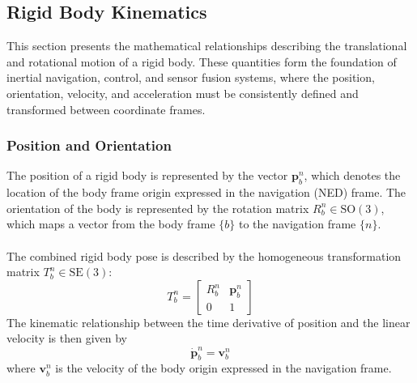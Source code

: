 \subsection{Rigid Body Kinematics}
This section presents the mathematical relationships describing the translational and rotational motion of a rigid body. These quantities form the foundation of inertial navigation, control, and sensor fusion systems, where the position, orientation, velocity, and acceleration must be consistently defined and transformed between coordinate frames.  



\subsubsection{Position and Orientation}
The position of a rigid body is represented by the vector $\mathbf{p}_b^n$, which denotes the location of the body frame origin expressed in the navigation (NED) frame. The orientation of the body is represented by the rotation matrix $R_b^n \in \mathrm{SO}(3)$, which maps a vector from the body frame $\{b\}$ to the navigation frame $\{n\}$.  
\\ \\
The combined rigid body pose is described by the homogeneous transformation matrix $T_b^n \in \mathrm{SE}(3)$:
$$
    T_b^n =
    \begin{bmatrix}
        R_b^n & \mathbf{p}_b^n \\
        0 & 1
    \end{bmatrix}
$$
The kinematic relationship between the time derivative of position and the linear velocity is then given by
$$
    \dot{\mathbf{p}}_b^n = \mathbf{v}_b^n
$$
where $\mathbf{v}_b^n$ is the velocity of the body origin expressed in the navigation frame.  



